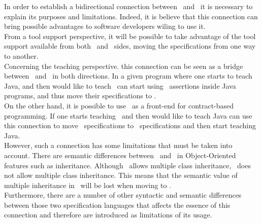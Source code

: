 In order to establish a bidirectional connection between \vpp\ and \jml\ it is necessary to explain its purposes and limitations. Indeed, it is believe that this connection can bring possible advantages to software developers wiling to use it.\\
From a tool support perspective, it will be possible to take advantage of the tool support available from both \vpp\ and \jml\ sides, moving the specifications from one way to another.\\
Concerning the teaching perspective. this connection can be seen as a bridge between \vpp\ and \jml\ in both directions. In a given program where one starts to teach Java, and then would like to teach \vpp\ can start using \jml\ assertions inside Java programs, and thus move their specifications to \vpp.\\
On the other hand, it is possible to use \vpp\ as a front-end for contract-based programming. If one starts teaching \vpp\ and then would like to teach Java can use this connection to move \vpp\ specifications to \jml\ specifications and then start teaching Java.\\
However, such a connection has some limitations that must be taken into account. There are semantic differences between \vpp\ and \jml\ in Object-Oriented features such as inheritance. Although \vpp\ allows multiple class inheritance, \jml\ does not allow multiple class inheritance. This means that the semantic value of multiple inheritance in \vpp\ will be lost when moving to \jml.\\ 
Furthermore, there are a number of other syntactic and semantic differences between those two specification languages that affects the essence of this connection and therefore are introduced as limitations of its usage.\\

